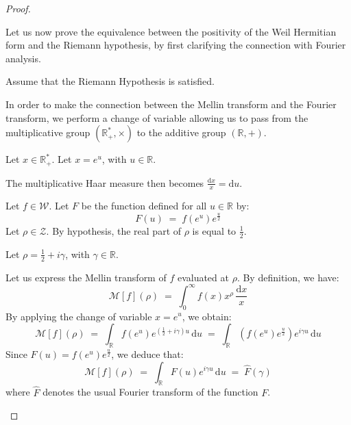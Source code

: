 \documentclass[Riemann_Hypothesis.tex]{subfiles}
\begin{document}
\begin{proof}
    \begin{part_proof}
        Let us now prove the equivalence between the positivity of the Weil Hermitian form and the Riemann hypothesis, by first clarifying the connection with Fourier analysis. \medskip\par
        Assume that the Riemann Hypothesis is satisfied. \par
        In order to make the connection between the Mellin transform and the Fourier transform, we perform a change of variable allowing us to pass from the multiplicative group $\left(\mathbb{R}_+^*, \times\right)$ to the additive group $\left(\mathbb{R}, +\right)$. \par
        Let $x \in \mathbb{R}_+^*$. Let $x = e^u$, with $u \in \mathbb{R}$. \par
        The multiplicative Haar measure then becomes $\frac{\mathrm{d}x}{x} = \mathrm{d}u$. \par
        Let $f \in \mathcal{W}$. Let $F$ be the function defined for all $u \in \mathbb{R}$ by:
        \begin{equation*}
            F(u) \;=\; f\left(e^u\right) e^{\frac{u}{2}}
        \end{equation*}
        Let $\rho \in \mathcal{Z}$. By hypothesis, the real part of $\rho$ is equal to $\frac{1}{2}$. \par
        Let $\rho = \frac{1}{2} + i\gamma$, with $\gamma \in \mathbb{R}$. \par
        Let us express the Mellin transform of $f$ evaluated at $\rho$. By definition, we have:
        \begin{equation*}
            \mathcal{M}[f](\rho) \;=\; \int_{0}^{\infty} f(x) x^{\rho} \, \frac{\mathrm{d}x}{x}
        \end{equation*}
        By applying the change of variable $x = e^u$, we obtain:
        \begin{equation*}
            \mathcal{M}[f](\rho) \;=\; 
            \int_{\mathbb{R}} f\left(e^u\right) e^{\left(\frac{1}{2} + i\gamma\right)u} \, \mathrm{d}u \;=\; 
            \int_{\mathbb{R}} \left( f\left(e^u\right) e^{\frac{u}{2}} \right) e^{i\gamma u} \, \mathrm{d}u
        \end{equation*}
        Since $F(u) = f(e^u) e^{\frac{u}{2}}$, we deduce that:
        \begin{equation*}
            \mathcal{M}[f](\rho) \;=\; \int_{\mathbb{R}} F(u) e^{i\gamma u} \, \mathrm{d}u \;=\; \hat{F}(\gamma)
        \end{equation*}
        where $\hat{F}$ denotes the usual Fourier transform of the function $F$. \par

\end{part_proof}
\end{proof}
\end{document}
